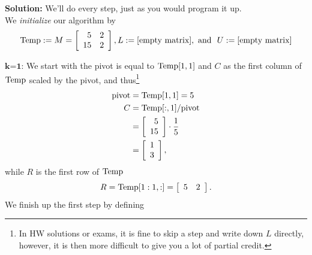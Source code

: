 \textbf{Solution:}  We'll do every step, just as you would program it up.\\

We \textit{initialize} our algorithm by $${\rm Temp}:= M = \left[\begin{array}{rr} 5 & 2\\
15 & 2 \end{array}\right], L:=[\textrm{empty matrix}],~\text{and}~~ U:=[\textrm{empty matrix}]$$

$\textbf{k=1:}$ We start with the pivot is equal to $\rm Temp[1,1]$ and $C$ as the first column of ${\rm Temp}$ scaled by the pivot, and thus\footnote{In HW solutions or exams, it is fine to skip a step and write down $L$ directly, however, it is then more difficult to give you a lot of partial credit.}
\begin{align*}
\textrm{pivot}&={\rm Temp}[1,1] = 5\\
C&={\rm Temp}[:,1] \slash\textrm{pivot} \\
 &=  \left[\begin{array}{r} 5 \\ 15 \end{array} \right] \cdot \frac{1}{5}\\ 
&= \left[\begin{array}{r} 1 \\ 3\end{array} \right], \end{align*}
while $R$ is the first row of  ${\rm Temp}$ 
$$ R =  {\rm Temp[1:1,:]}=\left[\begin{array}{rr} 5 & 2 \end{array} \right].$$
We finish up the first step by defining
